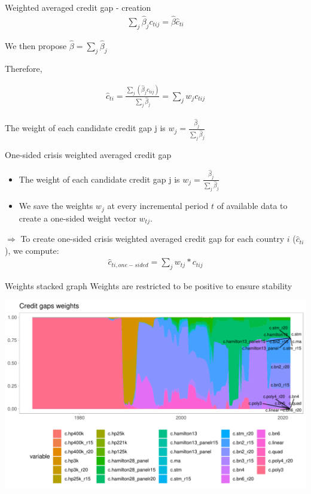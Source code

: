 \documentclass[
  ignorenonframetext,
]{beamer}
\begin{document}
\begin{frame}{Weighted averaged credit gap - creation}
\protect\hypertarget{weighted-averaged-credit-gap---creation}{}
\begin{align*}
\sum\limits_j \hat{\beta}_j c_{tij} = \hat{\beta} \hat{c}_{ti}
\end{align*}

We then propose \(\hat{\beta} = \sum\nolimits_j \hat{\beta}_j\)

Therefore,

\begin{align}
\hat{c}_{ti} = \frac{\sum\nolimits_j (\hat{\beta}_j c_{tij})}{\sum\nolimits_j\hat{\beta}_j} = \sum\nolimits_j w_j c_{tij}
\end{align}

The weight of each candidate credit gap j is
\(w_j = \frac{\hat{\beta}_j}{\sum\nolimits_j\hat{\beta}_j}\)
\end{frame}

\begin{frame}{One-sided crisis weighted averaged credit gap}
\protect\hypertarget{one-sided-crisis-weighted-averaged-credit-gap}{}
\begin{itemize}
\item
  The weight of each candidate credit gap j is
  \(w_j = \frac{\hat{\beta}_j}{\sum\nolimits_j\hat{\beta}_j}\)
\item
  We save the weights \(w_j\) at every incremental period \(t\) of
  available data to create a one-sided weight vector \(w_{tj}\).
\end{itemize}

\(\Rightarrow\) To create one-sided crisis weighted averaged credit gap
for each country \(i\) (\(\hat{c}_{ti}\)), we compute: \begin{align}
\hat{c}_{ti,one-sided} = \sum\nolimits_{j} w_{tj} * c_{tij}
\end{align}
\end{frame}

\begin{frame}{Weights stacked graph}
\protect\hypertarget{weights-stacked-graph}{}
Weights are restricted to be positive to ensure stability

\begin{center}\includegraphics[width=1\linewidth]{../Data/Output/Graphs/Weights_stack} \end{center}
\end{frame}
\end{document}
